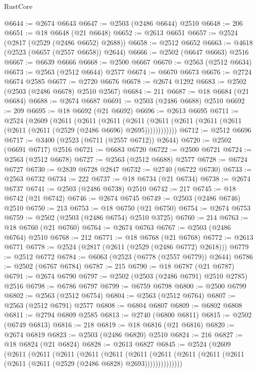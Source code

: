 \begin{lexlean}{RustCore}
\begin{coremodule}
@6644 := @2674 @6643
@6647 := @2503 (@2486 @6644) @2510
@6648 := 206
@6651 := @18 @6648 (@21 @6648)
@6652 := @2613 @6651
@6657 := @2524 (@2817 (@2529 (@2486 @6652) @2688))
@6658 := @2512 @6652
@6663 := @4618 (@2523 (@6657 (@2557 @6658)) @2644)
@6666 := @2502 (@6647 @6663) @2516
@6667 := @6639 @6666
@6668 := @2500 @6667
@6670 := @2563 (@2512 @6634)
@6673 := @2563 (@2512 @6644) @2577
@6674 := @6670 @6673
@6676 := @2724 @6674 @2585
@6677 := @2720 @6676
@6678 := @2674 @1292
@6683 := @2502 (@2503 (@2486 @6678) @2510 @2567)
@6684 := 211
@6687 := @18 @6684 (@21 @6684)
@6688 := @2674 @6687
@6691 := @2503 (@2486 @6688) @2510
@6692 := 209
@6695 := @18 @6692 (@21 @6692)
@6696 := @2613 @6695
@6711 := @2524
    (@2609
      (@2611
        (@2611
          (@2611
            (@2611 (@2611 (@2611 (@2611 (@2611 (@2611 (@2611 (@2529 (@2486 @6696) @2695))))))))))))
@6712 := @2512 @6696
@6717 := @3400 (@2523 (@6711 (@2557 @6712)) @2644)
@6720 := @2502 (@6691 @6717) @2516
@6721 := @6683 @6720
@6722 := @2500 @6721
@6724 := @2563 (@2512 @6678)
@6727 := @2563 (@2512 @6688) @2577
@6728 := @6724 @6727
@6730 := @2839 @6728 @2847
@6732 := @2740 (@6722 @6730)
@6733 := @2563 @6732
@6734 := 222
@6737 := @18 @6734 (@21 @6734)
@6738 := @2674 @6737
@6741 := @2503 (@2486 @6738) @2510
@6742 := 217
@6745 := @18 @6742 (@21 @6742)
@6746 := @2674 @6745
@6749 := @2503 (@2486 @6746) @2510
@6750 := 213
@6753 := @18 @6750 (@21 @6750)
@6754 := @2674 @6753
@6759 := @2502 (@2503 (@2486 @6754) @2510 @3725)
@6760 := 214
@6763 := @18 @6760 (@21 @6760)
@6764 := @2674 @6763
@6767 := @2503 (@2486 @6764) @2510
@6768 := 212
@6771 := @18 @6768 (@21 @6768)
@6772 := @2613 @6771
@6778 := @2524 (@2817 (@2611 (@2529 (@2486 @6772) @2618)))
@6779 := @2512 @6772
@6784 := @6063 (@2523 (@6778 (@2557 @6779)) @2644)
@6786 := @2502 (@6767 @6784)
@6787 := 215
@6790 := @18 @6787 (@21 @6787)
@6791 := @2674 @6790
@6797 := @2502 (@2503 (@2486 @6791) @2510 @2785) @2516
@6798 := @6786 @6797
@6799 := @6759 @6798
@6800 := @2500 @6799
@6802 := @2563 (@2512 @6754)
@6804 := @2563 (@2512 @6764)
@6807 := @2563 (@2512 @6791) @2577
@6808 := @6804 @6807
@6809 := @6802 @6808
@6811 := @2794 @6809 @2585
@6813 := @2740 (@6800 @6811)
@6815 := @2502 (@6749 @6813)
@6816 := 218
@6819 := @18 @6816 (@21 @6816)
@6820 := @2674 @6819
@6823 := @2503 (@2486 @6820) @2510
@6824 := 216
@6827 := @18 @6824 (@21 @6824)
@6828 := @2613 @6827
@6845 := @2524
    (@2609
      (@2611
        (@2611
          (@2611
            (@2611
              (@2611
                (@2611
                  (@2611 (@2611 (@2611 (@2611 (@2611 (@2611 (@2529 (@2486 @6828) @2693))))))))))))))

\end{coremodule}
\end{lexlean}
